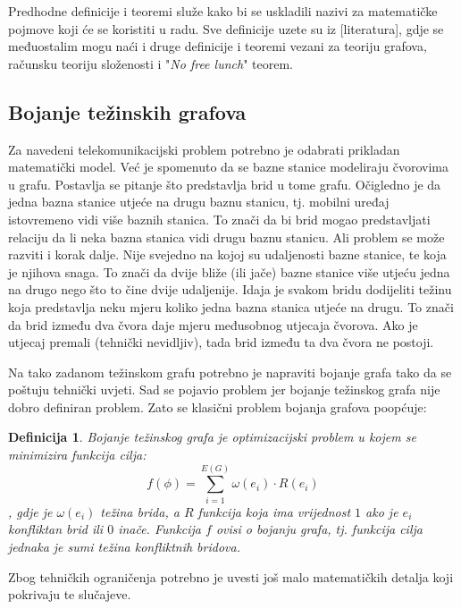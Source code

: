 \documentclass[times, utf8, diplomski, numeric]{fer}
\newtheorem{definition}{Definicija}
\begin{document}
Predhodne definicije i teoremi služe kako bi se uskladili nazivi za matematičke pojmove koji će se koristiti u radu. Sve definicije uzete su iz [literatura], gdje se međuostalim mogu naći i druge definicije i teoremi vezani za teoriju grafova, računsku teoriju složenosti i "\emph{No free lunch}" teorem.

\subsection{Bojanje težinskih grafova}

Za navedeni telekomunikacijski problem potrebno je odabrati prikladan matematički model. Već je spomenuto da se bazne stanice modeliraju čvorovima u grafu. Postavlja se pitanje što predstavlja brid u tome grafu. Očigledno je da jedna bazna stanice utjeće na drugu baznu stanicu, tj. mobilni uređaj istovremeno vidi više baznih stanica. To znači da bi brid mogao predstavljati relaciju da li neka bazna stanica vidi drugu baznu stanicu. Ali problem se može razviti i korak dalje. Nije svejedno na kojoj su udaljenosti bazne stanice, te koja je njihova snaga. To znači da dvije bliže (ili jače) bazne stanice više utjeću jedna na drugo nego što to čine dvije udaljenije. Idaja je svakom bridu dodijeliti težinu koja predstavlja neku mjeru koliko jedna bazna stanica utjeće na drugu. To znači da brid između dva čvora daje mjeru međusobnog utjecaja čvorova. Ako je utjecaj premali (tehnički nevidljiv), tada brid između ta dva čvora ne postoji.

Na tako zadanom težinskom grafu potrebno je napraviti bojanje grafa tako da se poštuju tehnički uvjeti. Sad se pojavio problem jer bojanje težinskog grafa nije dobro definiran problem. Zato se klasični problem bojanja grafova poopćuje:

\begin{definition}
Bojanje težinskog grafa je optimizacijski problem u kojem se minimizira funkcija cilja:
\begin{equation}
f(\phi) = \sum_{i=1}^{E(G)} \omega(e_i) \cdot R(e_i)
\end{equation}
, gdje je $\omega(e_i)$ težina brida, a $R$ funkcija koja ima vrijednost $1$ ako je $e_i$ konfliktan brid ili $0$ inače. Funkcija $f$ ovisi o bojanju grafa, tj. funkcija cilja jednaka je sumi težina konfliktnih bridova.
\end{definition}

Zbog tehničkih ograničenja potrebno je uvesti još malo matematičkih detalja koji pokrivaju te slučajeve.
\end{document}
